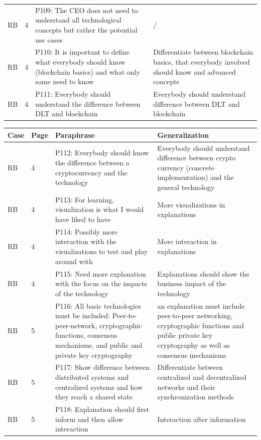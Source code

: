 \begin{table}[H]
\begin{tabularx}{\textwidth}{ll|X|p{4.5cm}}
	RB & 4 & P109: The CEO does not need to understand all technological concepts but rather the potential use cases & /   \\  
	RB & 4 & P110: It is important to define what everybody should know (blockchain basics) and what only some need to know & Differentiate between blockchain basics, that everybody involved should know and advanced concepts   \\  
	RB & 4 & P111: Everybody should understand the difference between DLT and blockchain & Everybody should understand difference between DLT and blockchain     \\  
	\end{tabularx}
\end{table}

\begin{table}[H]
    \centering
    \begin{tabularx}{\textwidth}{ll|X|p{4.5cm}}
	Case & Page & Paraphrase & Generalization \\ \hline
	RB & 4 & P112: Everybody should know the difference between a cryptocurrency and the technology & Everybody should understand difference between crypto currency (concrete implementation) and the general technology \\ 
	RB & 4 & P113: For learning, visualization is what I would have liked to have & More visualizations in explanations   \\  
	RB & 4 & P114: Possibly more interaction with the visualizations to test and play around with & More interaction in explanations   \\  
	RB & 4 & P115: Need more explanation with the focus on the impacts of the technology & Explanations should show the business impact of the technology   \\  
	RB & 5 & P116: All basic technologies must be included: Peer-to-peer-network, cryptographic functions, consensus mechanisms, and public and private key cryptography & an explanation must include peer-to-peer networking, cryptographic functions and public private key cryptography as well as consensus mechanisms   \\  
	RB & 5 & P117: Show difference between distributed systems and centralized systems and how they reach a shared state & Differentiate between centralized and decentralized networks and their synchronization methods   \\  
	RB & 5 & P118: Explanation should first inform and then allow interaction & Interaction after information   \\  

\end{tabularx}
\end{table}
